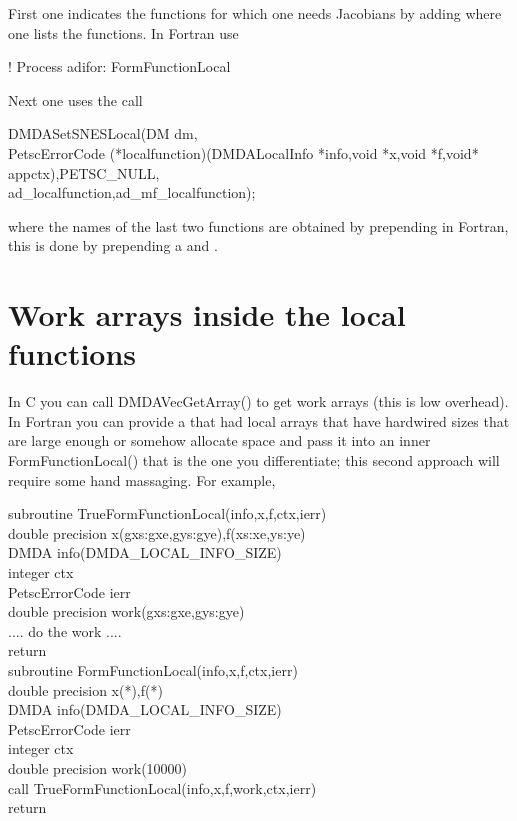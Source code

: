 First one indicates the functions for which one needs Jacobians by adding
where one lists the functions. In Fortran use
\begin{tabbing}
!     Process adifor: FormFunctionLocal
\end{tabbing}
Next one uses the call
\begin{tabbing}
  DMDASetSNESLocal(DM dm,\\
   PetscErrorCode (*localfunction)(DMDALocalInfo *info,void *x,void *f,void* appctx),PETSC\_NULL,\\
  ad\_localfunction,ad\_mf\_localfunction);
\end{tabbing}
where the names of the last two functions are obtained
by prepending in Fortran, this is done by prepending a  and .

\section{Work arrays inside the local functions} In C you can call DMDAVecGetArray() to get
work arrays (this is low overhead). In Fortran you can provide a 
that had local arrays that have hardwired sizes that are large enough or somehow allocate
space and pass it into an inner FormFunctionLocal() that is the one you differentiate; this
second approach will require some hand massaging. For example,

\begin{tabbing}
  subroutine TrueFormFunctionLocal(info,x,f,ctx,ierr)\\
  double precision x(gxs:gxe,gys:gye),f(xs:xe,ys:ye)\\
  DMDA info(DMDA\_LOCAL\_INFO\_SIZE)\\
  integer ctx\\
  PetscErrorCode ierr\\
  double precision work(gxs:gxe,gys:gye)\\

  .... do the work ....\\


  return\\

  subroutine FormFunctionLocal(info,x,f,ctx,ierr)\\

  double precision x(*),f(*)\\
  DMDA info(DMDA\_LOCAL\_INFO\_SIZE)\\
  PetscErrorCode ierr\\
  integer ctx\\
  double precision work(10000)\\

  call TrueFormFunctionLocal(info,x,f,work,ctx,ierr)\\
  return
\end{tabbing}

